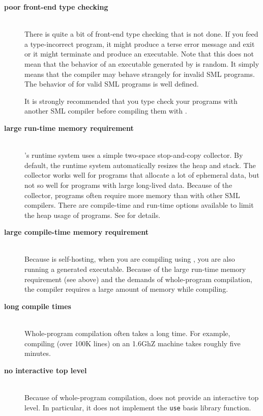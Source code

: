 
\newcommand{\drawback}[1]{\item[\bf #1]\hspace{1in}\\}

\begin{description}

\drawback{poor front-end type checking}
There is quite a bit of front-end type checking that is not done.  If
you feed {\mlton} a type-incorrect program, it might produce a terse
error message and exit or it might terminate and produce an
executable.  Note that this does not mean that the behavior of an
executable generated by {\mlton} is random.  It simply means that the
compiler may behave strangely for invalid SML programs.  The behavior
of {\mlton} for valid SML programs is well defined.

It is strongly recommended that you type check your programs with
another SML compiler before compiling them with {\mlton}.

\drawback{large run-time memory requirement}
{\mlton}'s runtime system uses a simple two-space stop-and-copy
collector.  By default, the runtime system automatically resizes the
heap and stack.  The collector works well for programs that allocate a
lot of ephemeral data, but not so well for programs with large
long-lived data.  Because of the collector, programs often require
more memory than with other SML compilers.  There are compile-time and
run-time options available to limit the heap usage of programs.  See
 for details.

\drawback{large compile-time memory requirement}
Because {\mlton} is self-hosting, when you are compiling using
{\mlton}, you are also running a {\mlton} generated executable.
Because of the large run-time memory requirement (see above) and the demands of
whole-program compilation, the compiler requires a large amount of memory while
compiling.

\drawback{long compile times}
Whole-program compilation often takes a long time.  For example, compiling
{\mlton} (over 100K lines) on an 1.6GhZ machine takes roughly five minutes.

\drawback{no interactive top level}
Because of whole-program compilation, {\mlton} does not provide an
interactive top level.  In particular, it does not implement the {\tt use} basis
library function.

\end{description}
